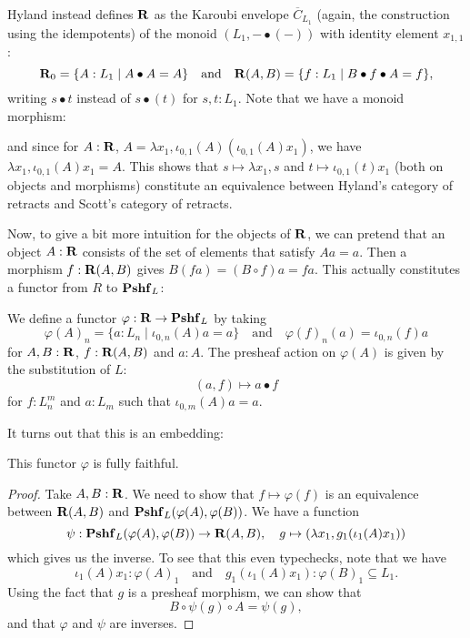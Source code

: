 \begin{remark}
  Hyland instead defines $ \mathbf{R} $ as the Karoubi envelope $ \overline C_{L_1} $ (again, the construction using the idempotents) of the monoid $ (L_1, - \bullet (-)) $ with identity element $ x_{1, 1} $:
  \[ \mathbf{R}_0 = \{ A : L_1 \mid A \bullet A = A \} \quad \text{and} \quad \mathbf{R}(A, B) = \{ f : L_1 \mid B \bullet f \bullet A = f \}, \]
  writing $ s \bullet t $ instead of $ s \bullet (t) $ for $ s, t : L_1 $. Note that we have a monoid morphism:
  \begin{center}
  \end{center}
  and since for $ A : \mathbf{R} $, $ A = \lambda x_1, \iota_{0, 1}(A) (\iota_{0, 1}(A) x_1) $, we have $ \lambda x_1, \iota_{0, 1}(A) x_1 = A $. This shows that $ s \mapsto \lambda x_1, s $ and $ t \mapsto \iota_{0, 1}(t) x_1 $ (both on objects and morphisms) constitute an equivalence between Hyland's category of retracts and Scott's category of retracts.
\end{remark}

Now, to give a bit more intuition for the objects of $ \mathbf{R} $, we can pretend that an object $ A : \mathbf{R} $ consists of the set of elements that satisfy $ A a = a $. Then a morphism $ f : \mathbf{R}(A, B) $ gives $ B (f a) = (B \circ f) a = f a $. This actually constitutes a functor from $ R $ to $ \mathbf{Pshf}_{L} $:

\begin{definition}\label{def:retracts-embedding}
  We define a functor $ \varphi: \mathbf{R} \to \mathbf{Pshf}_{L} $ by taking
  \[ \varphi(A)_n = \{ a : L_n \mid \iota_{0, n}(A) a = a \} \quad \text{and} \quad \varphi(f)_n(a) = \iota_{0, n}(f) a \]
  for $ A, B : \mathbf{R} $, $ f: \mathbf{R}(A, B) $ and $ a : A $. The presheaf action on $ \varphi(A) $ is given by the substitution of $ L $:
  \[ (a, f) \mapsto a \bullet f \]
  for $ f : L_n^m $ and $ a : L_m $ such that $ \iota_{0, m}(A) a = a $.
\end{definition}

It turns out that this is an embedding:
\begin{lemma}
  This functor $ \varphi $ is fully faithful.
\end{lemma}
\begin{proof}
  Take $ A, B : \mathbf{R} $. We need to show that $ f \mapsto \varphi(f) $ is an equivalence between $ \mathbf{R}(A, B) $ and $ \mathbf{Pshf}_{L}(\varphi(A), \varphi(B)) $. We have a function
  \[ \psi: \mathbf{Pshf}_{L}(\varphi(A), \varphi(B)) \to \mathbf{R}(A, B), \quad g \mapsto (\lambda x_1, g_1(\iota_1(A) x_1)) \]
  which gives us the inverse. To see that this even typechecks, note that we have
  \[ \iota_1(A) x_1 : \varphi(A)_1 \quad \text{and} \quad g_1(\iota_1(A) x_1) : \varphi(B)_1 \subseteq L_1. \]
  Using the fact that $ g $ is a presheaf morphism, we can show that
  \[ B \circ \psi(g) \circ A = \psi(g), \]
  and that $ \varphi $ and $ \psi $ are inverses.
\end{proof}

